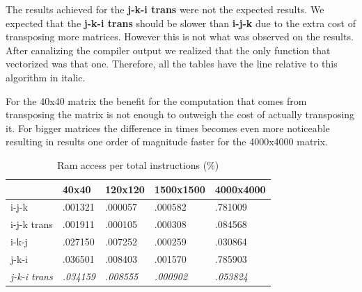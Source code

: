 \documentclass[a4paper]{report}
\begin{document}
The results achieved for the \textbf{j-k-i trans} were not the expected results.
We expected that the \textbf{j-k-i trans} should be slower than \textbf{i-j-k}
due to the extra cost of transposing more matrices. However this is not what was
observed on the results. After canalizing the compiler output we realized that
the only function that vectorized was that one. Therefore, all the tables have
the line relative to this algorithm in italic.

For the 40x40 matrix the benefit for the computation that comes from transposing
the matrix is not enough to outweigh the cost of actually transposing it. For
bigger matrices the difference in times becomes even more noticeable resulting in
results one order of magnitude faster for the 4000x4000 matrix.

\begin{table}[H]
\centering
\begin{tabular}{|l|l|l|l|l|}
\hline
            & 40x40   & 120x120 & 1500x1500 & 4000x4000 \\ \hline
i-j-k       & .001321 & .000057 & .000582   & .781009   \\ \hline
i-j-k trans & .001911 & .000105 & .000308   & .084568   \\ \hline
i-k-j       & .027150 & .007252 & .000259   & .030864   \\ \hline
j-k-i       & .036501 & .008403 & .001570   & .785903   \\ \hline
\textit{j-k-i trans} & \textit{.034159} & \textit{.008555} & \textit{.000902}
                     & \textit{.053824}   \\ \hline
\end{tabular}
\caption{Ram access per total instructions (\%)}
\end{table}
\end{document}
